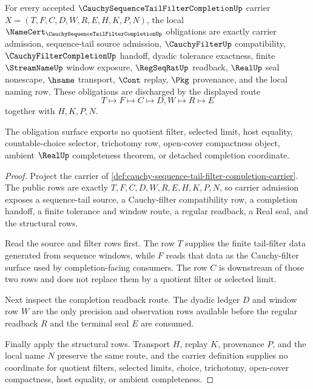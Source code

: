\begin{theorem}
\label{thm:cauchy-sequence-tail-filter-completion-namecert-obligations}
For every accepted $\CauchySequenceTailFilterCompletionUp$ carrier $X=(T,F,C,D,W,R,E,H,K,P,N)$, the local $\NameCert_{\CauchySequenceTailFilterCompletionUp}$ obligations are exactly carrier admission, sequence-tail source admission, $\CauchyFilterUp$ compatibility, $\CauchyFilterCompletionUp$ handoff, dyadic tolerance exactness, finite $\StreamNameUp$ window exposure, $\RegSeqRatUp$ readback, $\RealUp$ seal nonescape, $\hsame$ transport, $\Cont$ replay, $\Pkg$ provenance, and the local naming row. These obligations are discharged by the displayed route
$$
T \longmapsto F \longmapsto C \longmapsto D,W \longmapsto R \longmapsto E
$$
together with $H,K,P,N$.

The obligation surface exports no quotient filter, selected limit, host equality, countable-choice selector, trichotomy row, open-cover compactness object, ambient $\RealUp$ completeness theorem, or detached completion coordinate.
\end{theorem}
\begin{proof}
Project the carrier of \autoref{def:cauchy-sequence-tail-filter-completion-carrier}. The public rows are exactly $T,F,C,D,W,R,E,H,K,P,N$, so carrier admission exposes a sequence-tail source, a Cauchy-filter compatibility row, a completion handoff, a finite tolerance and window route, a regular readback, a Real seal, and the structural rows.

Read the source and filter rows first. The row $T$ supplies the finite tail-filter data generated from sequence windows, while $F$ reads that data as the Cauchy-filter surface used by completion-facing consumers. The row $C$ is downstream of those two rows and does not replace them by a quotient filter or selected limit.

Next inspect the completion readback route. The dyadic ledger $D$ and window row $W$ are the only precision and observation rows available before the regular readback $R$ and the terminal seal $E$ are consumed.

Finally apply the structural rows. Transport $H$, replay $K$, provenance $P$, and the local name $N$ preserve the same route, and the carrier definition supplies no coordinate for quotient filters, selected limits, choice, trichotomy, open-cover compactness, host equality, or ambient completeness.
\end{proof}

